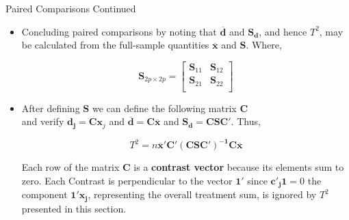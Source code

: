 \documentclass[8pt]{beamer}
\begin{document}
    \begin{frame}{Paired Comparisons Continued}
        \begin{itemize}
            
            \item Concluding paired comparisons by noting that $\mathbf{\overline{d}}$ and $\mathbf{S_{d}}$, and hence $T^{2}$, may be calculated from the full-sample quantities $\mathbf{\overline{x}}$ and $\mathbf{S}$. Where, 
                
            \begin{displaymath}
            \mathbf{S}_{2p \times 2p} = 
            \begin{bmatrix}
                    \mathbf{S}_{11} & \mathbf{S}_{12}\\
                    \mathbf{S}_{21} & \mathbf{S}_{22}\\
            \end{bmatrix}
            \end{displaymath}
        
            \item After defining $\mathbf{S}$ we can define the following matrix $\mathbf{C}$\\
            and verify $\mathbf{d_{j}} = \mathbf{C}\mathbf{x}_{j}$ and $\overline{\mathbf{d}} = \mathbf{C}\mathbf{\overline{x}}$ and $\mathbf{S_{d}} = \mathbf{CSC}'$. Thus, 
            
            \begin{equation} \label{eq:6}
                T^{2} = n\mathbf{\overline{x}'C'(CSC')^{-1}C\overline{x}}
            \end{equation}
            
            Each row of the matrix $\mathbf{C}$ is a \textbf{contrast vector} because its elements sum to zero. Each Contrast is perpendicular to the vector $\mathbf{1}'$ since $\mathbf{c'_{j}1} = 0$ the component $\mathbf{1'x_{j}}$, representing the overall treatment sum, is ignored by $T^{2}$ presented in this section. 
                
        \end{itemize}
    \end{frame}
\end{document}
